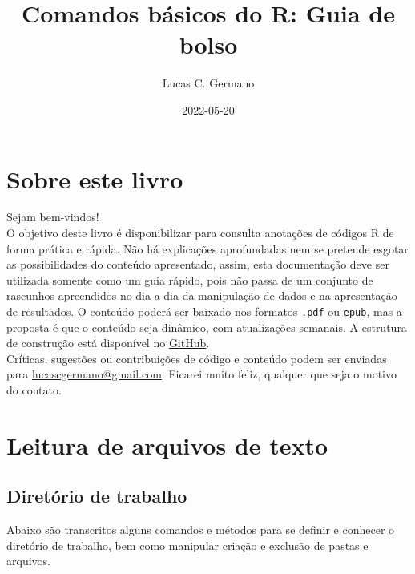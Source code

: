 \documentclass[
]{book}
\title{Comandos básicos do R: Guia de bolso}
\author{Lucas C. Germano}
\date{2022-05-20}
\theoremstyle{definition}
\theoremstyle{definition}
\theoremstyle{definition}
\theoremstyle{definition}
\theoremstyle{remark}
\begin{document}
\maketitle

{
\setcounter{tocdepth}{1}
\tableofcontents
}
\hypertarget{sobre-este-livro}{%
\chapter*{Sobre este livro}\label{sobre-este-livro}}

Sejam bem-vindos!\\
O objetivo deste livro é disponibilizar para consulta anotações de códigos R de forma prática e rápida. Não há explicações aprofundadas nem se pretende esgotar as possibilidades do conteúdo apresentado, assim, esta documentação deve ser utilizada somente como um guia rápido, pois não passa de um conjunto de rascunhos apreendidos no dia-a-dia da manipulação de dados e na apresentação de resultados. O conteúdo poderá ser baixado nos formatos \texttt{.pdf} ou \texttt{epub}, mas a proposta é que o conteúdo seja dinâmico, com atualizações semanais. A estrutura de construção está disponível no \href{https://github.com/lucascgmermano/guia_de_bolso.git}{GitHub}.\\
Críticas, sugestões ou contribuições de código e conteúdo podem ser enviadas para \url{lucascgermano@gmail.com}. Ficarei muito feliz, qualquer que seja o motivo do contato.

\hypertarget{leitura-de-arquivos-de-texto}{%
\chapter{Leitura de arquivos de texto}\label{leitura-de-arquivos-de-texto}}

\hypertarget{diretuxf3rio-de-trabalho}{%
\section{Diretório de trabalho}\label{diretuxf3rio-de-trabalho}}

Abaixo são transcritos alguns comandos e métodos para se definir e conhecer o diretório de trabalho, bem como manipular criação e exclusão de pastas e arquivos.
\end{document}
